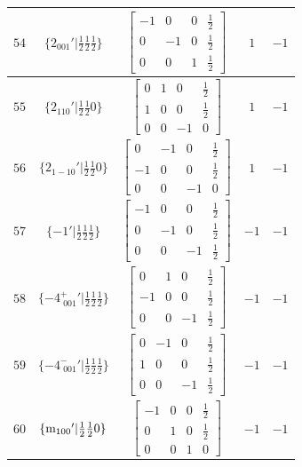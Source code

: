 \documentclass[fleqn,8pt]{jsarticle}
\begin{document}
\begin{longtable}{ccccc}
$ 54 $ & $ \{2{}_{001}{}'|\frac{1}{2} \frac{1}{2} \frac{1}{2}\} $ & $ \begin{bmatrix} -1 & 0 & 0 & \frac{1}{2} \\ 0 & -1 & 0 & \frac{1}{2} \\ 0 & 0 & 1 & \frac{1}{2} \end{bmatrix} $ & $ 1 $ & $ -1 $ \\ \hline
$ 55 $ & $ \{2{}_{110}{}'|\frac{1}{2} \frac{1}{2} 0\} $ & $ \begin{bmatrix} 0 & 1 & 0 & \frac{1}{2} \\ 1 & 0 & 0 & \frac{1}{2} \\ 0 & 0 & -1 & 0 \end{bmatrix} $ & $ 1 $ & $ -1 $ \\ \hline
$ 56 $ & $ \{2{}_{1-10}{}'|\frac{1}{2} \frac{1}{2} 0\} $ & $ \begin{bmatrix} 0 & -1 & 0 & \frac{1}{2} \\ -1 & 0 & 0 & \frac{1}{2} \\ 0 & 0 & -1 & 0 \end{bmatrix} $ & $ 1 $ & $ -1 $ \\ \hline
$ 57 $ & $ \{-1{}'|\frac{1}{2} \frac{1}{2} \frac{1}{2}\} $ & $ \begin{bmatrix} -1 & 0 & 0 & \frac{1}{2} \\ 0 & -1 & 0 & \frac{1}{2} \\ 0 & 0 & -1 & \frac{1}{2} \end{bmatrix} $ & $ -1 $ & $ -1 $ \\ \hline
$ 58 $ & $ \{-4^{+}_{\,\,001}{}'|\frac{1}{2} \frac{1}{2} \frac{1}{2}\} $ & $ \begin{bmatrix} 0 & 1 & 0 & \frac{1}{2} \\ -1 & 0 & 0 & \frac{1}{2} \\ 0 & 0 & -1 & \frac{1}{2} \end{bmatrix} $ & $ -1 $ & $ -1 $ \\ \hline
$ 59 $ & $ \{-4^{-}_{\,\,001}{}'|\frac{1}{2} \frac{1}{2} \frac{1}{2}\} $ & $ \begin{bmatrix} 0 & -1 & 0 & \frac{1}{2} \\ 1 & 0 & 0 & \frac{1}{2} \\ 0 & 0 & -1 & \frac{1}{2} \end{bmatrix} $ & $ -1 $ & $ -1 $ \\ \hline
$ 60 $ & $ \{{\rm m}_{100}{}'|\frac{1}{2} \frac{1}{2} 0\} $ & $ \begin{bmatrix} -1 & 0 & 0 & \frac{1}{2} \\ 0 & 1 & 0 & \frac{1}{2} \\ 0 & 0 & 1 & 0 \end{bmatrix} $ & $ -1 $ & $ -1 $ \\ \hline

\end{longtable}
\end{document}
